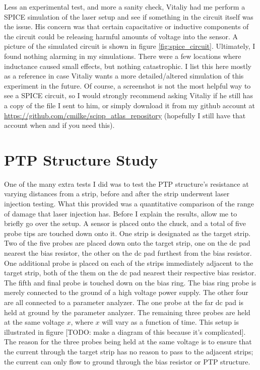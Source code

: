 \documentclass{report}
\begin{document}
            Less an experimental test, and more a sanity check, Vitaliy had me perform a SPICE simulation of the laser setup and see if something in the circuit itself was the issue. His concern was that certain capacitative or inductive components of the circuit could be releasing harmful amounts of voltage into the sensor. A picture of the simulated circuit is shown in figure \ref{fig:spice_circuit}. Ultimately, I found nothing alarming in my simulations. There were a few locations where inductance caused small effects, but nothing catastrophic. I list this here mostly as a reference in case Vitaliy wants a more detailed/altered simulation of this experiment in the future. Of course, a screenshot is not the most helpful way to see a SPICE circuit, so I would strongly recommend asking Vitaliy if he still has a copy of the file I sent to him, or simply download it from my github account at \url{https://github.com/cmilke/scipp\_atlas\_repository} (hopefully I still have that account when and if you need this).



        \section{PTP Structure Study} \label{sect:ptp_study}
            One of the many extra tests I did was to test the PTP structure's resistance at varying distances from a strip, before and after the strip underwent laser injection testing. What this provided was a quantitative comparison of the range of damage that laser injection has. Before I explain the results, allow me to briefly go over the setup. A sensor is placed onto the chuck, and a total of five probe tips are touched down onto it. One strip is designated as the target strip. Two of the five probes are placed down onto the target strip, one on the dc pad nearest the bias resistor, the other on the dc pad furthest from the bias resistor. One additional probe is placed on each of the strips immediately adjacent to the target strip, both of the them on the dc pad nearest their respective bias resistor. The fifth and final probe is touched down on the bias ring. The bias ring probe is merely connected to the ground of a high voltage power supply. The other four are all connected to a parameter analyzer. The one probe at the far dc pad is held at ground by the parameter analyzer. The remaining three probes are held at the same voltage $x$, where $x$ will vary as a function of time. This setup is illustrated in figure [TODO: make a diagram of this because it's complicated]. The reason for the three probes being held at the same voltage is to ensure that the current through the target strip has no reason to pass to the adjacent strips; the current can only flow to ground through the bias resistor or PTP structure.
\end{document}
